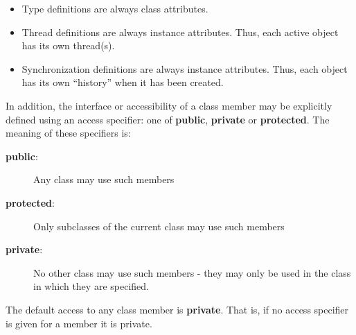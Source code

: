 \documentclass{overturerepchap}
\newcommand{\keyw}[1]{{\bf\ttfamily #1}}
\begin{document}
{\begin{itemize}
\item Type definitions are always class attributes.
\item Thread definitions are always instance attributes. Thus, each active
  object has its own thread(s).
\item Synchronization definitions are always instance attributes. Thus, each
  object has its own ``history'' when it has been created.
\end{itemize}

In addition, the interface or accessibility of a class member may be
explicitly defined using an access specifier: one of \keyw{public},
\keyw{private} or \keyw{protected}. The meaning of these specifiers
is:
\begin{description}
\item[\keyw{public}:] Any class may use such members
\item[\keyw{protected}:] Only subclasses of the current class may use
  such members
\item[\keyw{private}:] No other class may use such members - they may
  only be used in the class in which they are specified.
\end{description}

The default access to any class member is \keyw{private}. That is,
if no access specifier is given for a member it is private.

}
\end{document}
